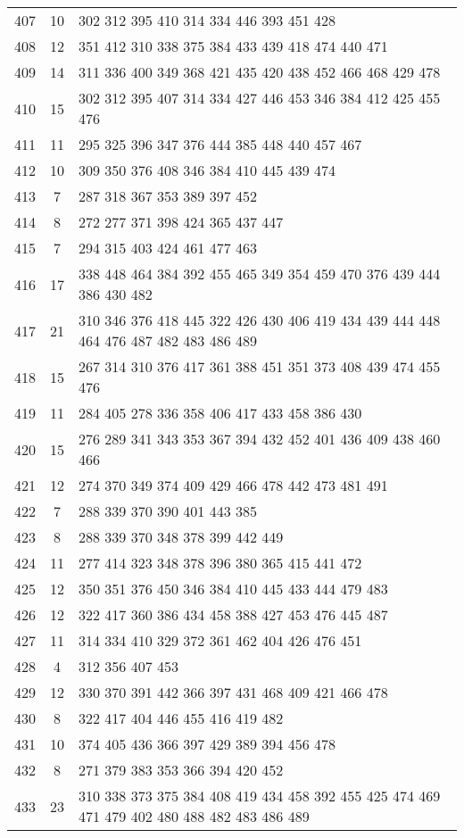\documentclass{standalone}
\begin{document}
\begin{tabular}{c c l}
407 & 10 & 302 312 395 410 314 334 446 393 451 428 \\
408 & 12 & 351 412 310 338 375 384 433 439 418 474 440 471 \\
409 & 14 & 311 336 400 349 368 421 435 420 438 452 466 468 429 478 \\
410 & 15 & 302 312 395 407 314 334 427 446 453 346 384 412 425 455 476 \\
411 & 11 & 295 325 396 347 376 444 385 448 440 457 467 \\
412 & 10 & 309 350 376 408 346 384 410 445 439 474 \\
413 & 7 & 287 318 367 353 389 397 452 \\
414 & 8 & 272 277 371 398 424 365 437 447 \\
415 & 7 & 294 315 403 424 461 477 463 \\
416 & 17 & 338 448 464 384 392 455 465 349 354 459 470 376 439 444 386 430 482 \\
417 & 21 & 310 346 376 418 445 322 426 430 406 419 434 439 444 448 464 476 487 482 483 486 489 \\
418 & 15 & 267 314 310 376 417 361 388 451 351 373 408 439 474 455 476 \\
419 & 11 & 284 405 278 336 358 406 417 433 458 386 430 \\
420 & 15 & 276 289 341 343 353 367 394 432 452 401 436 409 438 460 466 \\
421 & 12 & 274 370 349 374 409 429 466 478 442 473 481 491 \\
422 & 7 & 288 339 370 390 401 443 385 \\
423 & 8 & 288 339 370 348 378 399 442 449 \\
424 & 11 & 277 414 323 348 378 396 380 365 415 441 472 \\
425 & 12 & 350 351 376 450 346 384 410 445 433 444 479 483 \\
426 & 12 & 322 417 360 386 434 458 388 427 453 476 445 487 \\
427 & 11 & 314 334 410 329 372 361 462 404 426 476 451 \\
428 & 4 & 312 356 407 453 \\
429 & 12 & 330 370 391 442 366 397 431 468 409 421 466 478 \\
430 & 8 & 322 417 404 446 455 416 419 482 \\
431 & 10 & 374 405 436 366 397 429 389 394 456 478 \\
432 & 8 & 271 379 383 353 366 394 420 452 \\
433 & 23 & 310 338 373 375 384 408 419 434 458 392 455 425 474 469 471 479 402 480 488 482 483 486 489 \\

\end{tabular}
\end{document}
